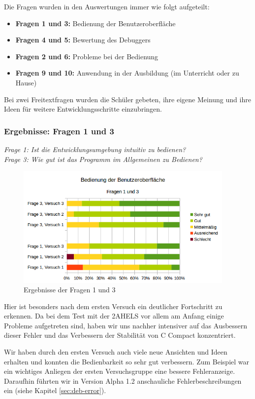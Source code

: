 Die Fragen wurden in den Auswertungen immer wie folgt aufgeteilt:
\begin{itemize}
\item \textbf{Fragen 1 und 3:} Bedienung der Benutzeroberfläche
\item \textbf{Fragen 4 und 5:} Bewertung des Debuggers
\item \textbf{Fragen 2 und 6:} Probleme bei der Bedienung
\item \textbf{Fragen 9 und 10:} Anwendung in der Ausbildung (im Unterricht oder zu Hause)
\end{itemize}

Bei zwei Freitextfragen wurden die Schüler gebeten, ihre eigene Meinung und ihre Ideen für weitere Entwicklungsschritte einzubringen.

\subsubsection*{Ergebnisse: Fragen 1 und 3}

\emph{Frage 1: Ist die Entwicklungsumgebung intuitiv zu bedienen?\\
Frage 3: Wie gut ist das Programm im Allgemeinen zu Bedienen?}

\begin{figure}[h!]
\centering
\includegraphics[width=0.95\textwidth]{./media/images/gui/trials/gui-f1-3.png}
\caption{Ergebnisse der Fragen 1 und 3}
\end{figure}

Hier ist besonders nach dem ersten Versuch ein deutlicher Fortschritt zu erkennen. Da bei dem Test mit der 2AHELS vor allem am Anfang einige Probleme aufgetreten sind, haben wir uns nachher intensiver auf das Ausbessern dieser Fehler und das Verbessern der Stabilität von C Compact konzentriert.

Wir haben durch den ersten Versuch auch viele neue Ansichten und Ideen erhalten und konnten die Bedienbarkeit so sehr gut verbessern. Zum Beispiel war ein wichtiges Anliegen der ersten Versuchsgruppe eine bessere Fehleranzeige. Daraufhin führten wir in Version Alpha 1.2 anschauliche Fehlerbeschreibungen ein (siehe Kapitel \ref{sec:deb-error}).

